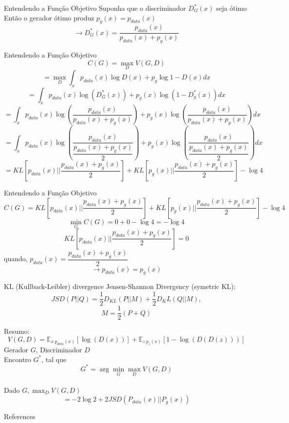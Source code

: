 \documentclass[10pt]{beamer}
\begin{document}
\begin{frame}[fragile]{Entendendo a Função Objetivo}
 Suponha que o discriminador $D^*_G(x)$ seja ótimo\\
 Então o gerador ótimo produz $p_g(x) = p_{data}(x)$ \\
 $$\rightarrow D^*_G(x) = \dfrac{p_{data}(x)}{p_{data}(x) + p_g(x)}$$
\end{frame}

\begin{frame}[fragile]{Entendendo a Função Objetivo}
  $$C(G) = \max_{D}V(G,D)$$
  \pause
  $$= \max_{D} \int_{x}p_{data}(x)\log{D(x)} + p_{g}\log{1-D(x)}dx $$
  \pause
  $$= \int_{x}p_{data}(x)\log{\left(D_{G}^{*}(x)\right)} + p_{g}(x)\log{\left(1-D_{g}^{*}(x)\right)}dx $$
  \pause
  $$= \int_{x}p_{data}(x)\log{\left(\dfrac{p_{data}(x)}{p_{data}(x) + p_{g}(x)}\right)} + p_{g}(x)\log{\left(\dfrac{p_{data}(x)}{p_{data}(x) + p_{g}(x)}\right)}dx $$
  \pause
  $$= \int_{x}p_{data}(x)\log{\left(\dfrac{p_{data}(x)}{\dfrac{p_{data}(x) + p_{g}(x)}{2}}\right)} + p_{g}(x)\log{\left(\dfrac{p_{data}(x)}{\dfrac{p_{data}(x) + p_{g}(x)}{2}}\right)}dx	$$
  \pause
  $$= KL\left[p_{data}(x)||\dfrac{p_{data}(x)+p_g(x)}{2}\right] + KL\left[p_g(x)||\dfrac{p_{data}(x) + p_g(x)}{2}\right] - \log{4} $$
\end{frame}

\begin{frame}[fragile]{Entendendo a Função Objetivo}
  $$C(G) = KL\left[p_{data}(x)||\frac{p_{data}(x)+p_g(x)}{2}\right] + KL\left[p_g(x)||\frac{p_{data}(x) + p_g(x)}{2}\right] - \log{4}$$
  \pause
  $$\min_G C(G) = 0+0-\log{4} = -\log{4} $$
  $$KL\left[p_{data}(x)||\dfrac{p_{data}(x) + p_g(x)}{2}\right] = 0$$
  \pause
  quando, $p_{data}(x) = \dfrac{p_{data}(x)+p_g(x)}{2}$
  \pause
  $$\rightarrow p_{data}(x) = p_g(x)$$
\end{frame}

\begin{frame}[fragile]{KL (Kullback-Leibler) divergence}
  Jensen-Shannon Divergency (symetric KL):
  $$JSD(P||Q) = \frac{1}{2}D_{KL}(P||M) + \frac{1}{2}D_KL(Q||M),$$
  $$M = \frac{1}{2}(P+Q)$$
\end{frame}

\begin{frame}[fragile]{Resumo:}
  $$V(G,D) = \mathbb{E}_{x~p_{data}(x)}\left[\log{(D(x))}\right]+\mathbb{E}_{z~p_z(x)}\left[1-\log{(D(D(z)))}\right]$$
  Gerador $G$, Discriminador $D$ \\
  Encontro $G^*$, tal que \\
  $$G^* = \arg{\min_G \max_D} V(G,D)$$\\
  Dado $G, \max_{D}V(G,D)$
  $$= -2\log{2} + 2JSD(P_{data}(x)||P_g(x))$$
\end{frame}


\begin{frame}[allowframebreaks]{References}

  \renewcommand{\section}[2]{}%
  
  

\end{frame}
\end{document}
